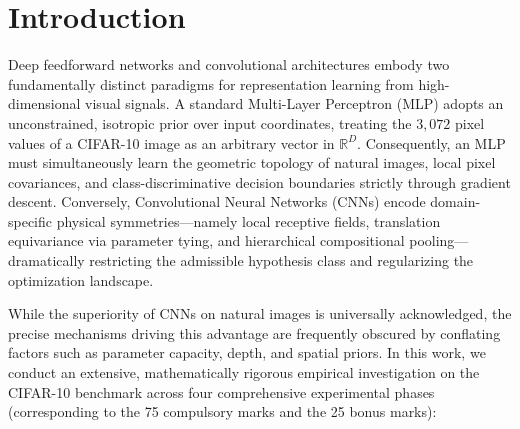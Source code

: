 \section{Introduction}
\label{sec:intro}

Deep feedforward networks and convolutional architectures embody two fundamentally distinct paradigms for representation learning from high-dimensional visual signals. A standard Multi-Layer Perceptron (MLP) adopts an unconstrained, isotropic prior over input coordinates, treating the $3{,}072$ pixel values of a CIFAR-10 image as an arbitrary vector in $\mathbb{R}^{D}$. Consequently, an MLP must simultaneously learn the geometric topology of natural images, local pixel covariances, and class-discriminative decision boundaries strictly through gradient descent. Conversely, Convolutional Neural Networks (CNNs) encode domain-specific physical symmetries—namely local receptive fields, translation equivariance via parameter tying, and hierarchical compositional pooling—dramatically restricting the admissible hypothesis class and regularizing the optimization landscape.

While the superiority of CNNs on natural images is universally acknowledged, the precise mechanisms driving this advantage are frequently obscured by conflating factors such as parameter capacity, depth, and spatial priors. In this work, we conduct an extensive, mathematically rigorous empirical investigation on the CIFAR-10 benchmark across four comprehensive experimental phases (corresponding to the 75 compulsory marks and the 25 bonus marks):

